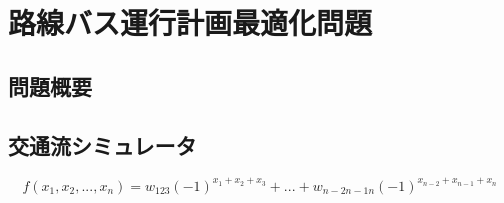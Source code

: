 \documentclass[main]{subfiles}
\begin{document}
\chapter{路線バス運行計画最適化問題}
\section{問題概要}
\section{交通流シミュレータ}
\begin{equation}
    f(x_1, x_2, ..., x_n) = w_{123}(-1)^{x_1+x_2+x_3} + ... + w_{n-2n-1n}(-1)^{x_{n-2}+x_{n-1}+x_n}
\end{equation}
\end{document}
